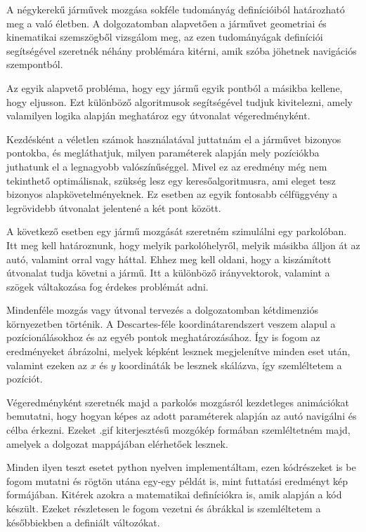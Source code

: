 
A négykerekű járművek mozgása sokféle tudományág definícióiból határozható meg a való életben. A dolgozatomban alapvetően a járművet geometriai és kinematikai szemszögből vizsgálom meg, az ezen tudományágak definíciói segítségével szeretnék néhány problémára kitérni, amik szóba jöhetnek navigációs szempontból.

Az egyik alapvető probléma, hogy egy jármű egyik pontból a másikba kellene, hogy eljusson. Ezt különböző algoritmusok segítségével tudjuk kivitelezni, amely valamilyen logika alapján meghatároz egy útvonalat végeredményként.

Kezdésként a véletlen számok használatával juttatnám el a járművet bizonyos pontokba, és megláthatjuk, milyen paraméterek alapján mely pozíciókba juthatunk el a legnagyobb valószínűséggel. Mivel ez az eredmény még nem tekinthető optimálisnak, szükség lesz egy keresőalgoritmusra, ami eleget tesz bizonyos alapkövetelményeknek. Ez esetben az egyik fontosabb célfüggvény a legrövidebb útvonalat jelentené a két pont között.

A következő esetben egy jármű mozgását szeretném szimulálni egy parkolóban. Itt meg kell határoznunk, hogy melyik parkolóhelyről, melyik másikba álljon át az autó, valamint orral vagy háttal. Ehhez meg kell oldani, hogy a kiszámított útvonalat tudja követni a jármű. Itt a különböző irányvektorok, valamint a szögek váltakozása fog érdekes problémát adni.

Mindenféle mozgás vagy útvonal tervezés a dolgozatomban kétdimenziós környezetben történik. A Descartes-féle koordinátarendszert veszem alapul a pozícionálásokhoz és az egyéb pontok meghatározásához. Így is fogom az eredményeket ábrázolni, melyek képként lesznek megjelenítve minden eset után, valamint ezeken az $ x $ és $ y $ koordináták be lesznek skálázva, így szemléltetem a pozíciót.

Végeredményként szeretnék majd a parkolós mozgásról kezdetleges animációkat bemutatni, hogy hogyan képes az adott paraméterek alapján az autó navigálni és célba érkezni. Ezeket .gif kiterjesztésű mozgókép formában szemléltetném majd, amelyek a dolgozat mappájában elérhetőek lesznek.

Minden ilyen teszt esetet python nyelven implementáltam, ezen kódrészeket is be fogom mutatni és rögtön utána egy-egy példát is, mint futtatási eredményt kép formájában. Kitérek azokra a matematikai definíciókra is, amik alapján a kód készült. Ezeket részletesen le fogom vezetni és ábrákkal is szemléltetem a későbbiekben a definiált változókat.


